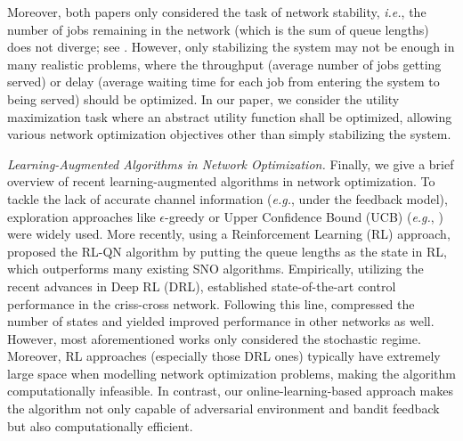 \documentclass[11pt,fullpage,letterpaper]{article} %
\begin{document}
Moreover, both papers only considered the task of network stability, \textit{i.e.}, the number of jobs remaining in the network (which is the sum of queue lengths) does not diverge; see . However, only stabilizing the system may not be enough in many realistic problems, where the throughput (average number of jobs getting served) \citep{tsibonis2003exploiting,sadiq2009throughput} or delay (average waiting time for each job from entering the system to being served) \citep{neely2008order,neely2009delay} should be optimized.
In our paper, we consider the utility maximization task \citep{huang2011utility,huang2012lifo} where an abstract utility function shall be optimized, allowing various network optimization objectives other than simply stabilizing the system.

\textit{Learning-Augmented Algorithms in Network Optimization.}
Finally, we give a brief overview of recent learning-augmented algorithms in network optimization.
To tackle the lack of accurate channel information (\textit{e.g.}, under the feedback model), exploration approaches like $\epsilon$-greedy \citep{krishnasamy2018augmenting,krishnasamy2021learning} or Upper Confidence Bound (UCB) \citep{auer2002using} (\textit{e.g.}, \citep{choudhury2021job,krishnasamy2021learning,yang2023learning}) were widely used.
More recently, using a Reinforcement Learning (RL) approach, \citet{liu2022rl} proposed the RL-QN algorithm by putting the queue lengths as the state in RL, which outperforms many existing SNO algorithms.
Empirically, utilizing the recent advances in Deep RL (DRL), \citet{dai2022queueing} established state-of-the-art control performance in the criss-cross network. Following this line, \citet{wei2024sample} compressed the number of states and yielded improved performance in other networks as well.
However, most aforementioned works only considered the stochastic regime. Moreover, RL approaches (especially those DRL ones) typically have extremely large space when modelling network optimization problems, making the algorithm computationally infeasible.
In contrast, our online-learning-based approach makes the algorithm not only capable of adversarial environment and bandit feedback but also computationally efficient.

\end{document}

